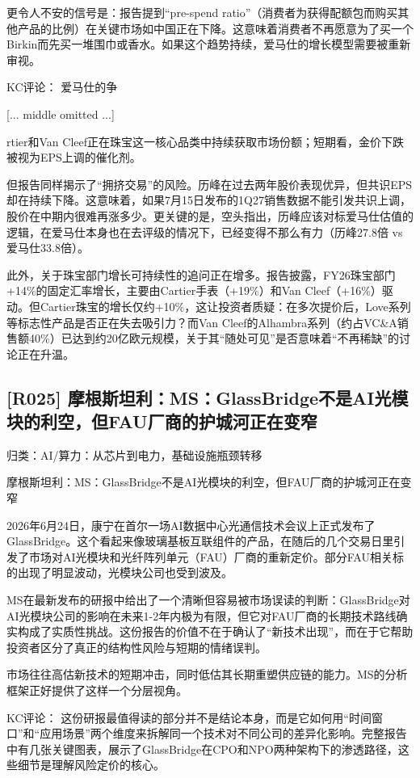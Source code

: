 \documentclass[11pt]{ctexart}
\begin{document}
更令人不安的信号是：报告提到“pre-spend ratio”（消费者为获得配额包而购买其他产品的比例）在关键市场如中国正在下降。这意味着消费者不再愿意为了买一个Birkin而先买一堆围巾或香水。如果这个趋势持续，爱马仕的增长模型需要被重新审视。

KC评论： 爱马仕的争

[... middle omitted ...]

rtier和Van Cleef正在珠宝这一核心品类中持续获取市场份额；短期看，金价下跌被视为EPS上调的催化剂。

但报告同样揭示了“拥挤交易”的风险。历峰在过去两年股价表现优异，但共识EPS却在持续下降。这意味着，如果7月15日发布的1Q27销售数据不能引发共识上调，股价在中期内很难再涨多少。更关键的是，空头指出，历峰应该对标爱马仕估值的逻辑，在爱马仕本身也在去评级的情况下，已经变得不那么有力（历峰27.8倍 vs 爱马仕33.8倍）。

此外，关于珠宝部门增长可持续性的追问正在增多。报告披露，FY26珠宝部门+14\%的固定汇率增长，主要由Cartier手表（+19\%）和Van Cleef（+16\%）驱动。但Cartier珠宝的增长仅约+10\%，这让投资者质疑：在多次提价后，Love系列等标志性产品是否正在失去吸引力？而Van Cleef的Alhambra系列（约占VC\&A销售额40\%）已达到约20亿欧元规模，关于其“随处可见”是否意味着“不再稀缺”的讨论正在升温。

\subsection{[R025] 摩根斯坦利：MS：GlassBridge不是AI光模块的利空，但FAU厂商的护城河正在变窄}
{\small\color{refgray}归类：AI/算力：从芯片到电力，基础设施瓶颈转移}

摩根斯坦利：MS：GlassBridge不是AI光模块的利空，但FAU厂商的护城河正在变窄

2026年6月24日，康宁在首尔一场AI数据中心光通信技术会议上正式发布了GlassBridge。这个看起来像玻璃基板互联组件的产品，在随后的几个交易日里引发了市场对AI光模块和光纤阵列单元（FAU）厂商的重新定价。部分FAU相关标的出现了明显波动，光模块公司也受到波及。

MS在最新发布的研报中给出了一个清晰但容易被市场误读的判断：GlassBridge对AI光模块公司的影响在未来1-2年内极为有限，但它对FAU厂商的长期技术路线确实构成了实质性挑战。这份报告的价值不在于确认了“新技术出现”，而在于它帮助投资者区分了真正的结构性风险与短期的情绪误判。

市场往往高估新技术的短期冲击，同时低估其长期重塑供应链的能力。MS的分析框架正好提供了这样一个分层视角。

KC评论： 这份研报最值得读的部分并不是结论本身，而是它如何用“时间窗口”和“应用场景”两个维度来拆解同一个技术对不同公司的差异化影响。完整报告中有几张关键图表，展示了GlassBridge在CPO和NPO两种架构下的渗透路径，这些细节是理解风险定价的核心。
\end{document}
